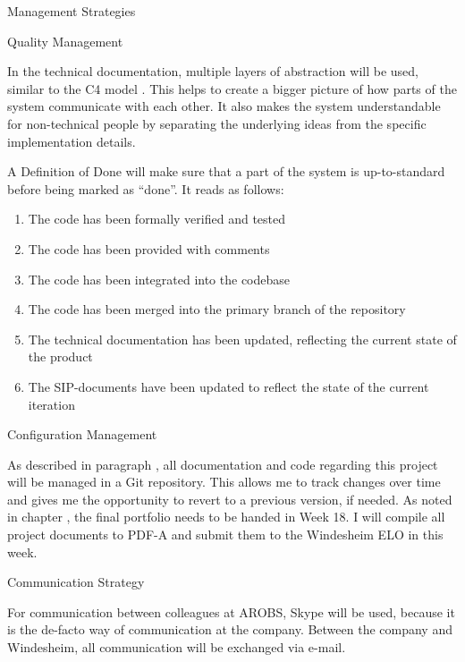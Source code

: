 \documentclass{matthijs}
\begin{document}
\begin{hoofdstuk}{Management Strategies}
\begin{paragraaf}{Quality Management}
			\bigskip

			In the technical documentation, multiple layers of abstraction will be used, similar to the C4 model \cite{brown2018the}.
			This helps to create a bigger picture of how parts of the system communicate with each other.
			It also makes the system understandable for non-technical people by separating the underlying ideas from the specific implementation details.

			\bigskip

			A Definition of Done will make sure that a part of the system is up-to-standard before being marked as \enquote{done}. It reads as follows:
			
			\begin{enumerate}
				\item The code has been formally verified and tested
				\item The code has been provided with comments
				\item The code has been integrated into the codebase
				\item The code has been merged into the primary branch of the repository
				\item The technical documentation has been updated, reflecting the current state of the product
				\item The SIP-documents have been updated to reflect the state of the current iteration
			\end{enumerate}

		\end{paragraaf}

		\begin{paragraaf}{Configuration Management}

			As described in paragraph , all documentation and code regarding this project will be managed in a Git repository.
			This allows me to track changes over time and gives me the opportunity to revert to a previous version, if needed.
			As noted in chapter , the final portfolio needs to be handed in Week 18.
			I will compile all project documents to PDF-A and submit them to the Windesheim ELO in this week.
			
		\end{paragraaf}

		\begin{paragraaf}{Communication Strategy}

			For communication between colleagues at AROBS, Skype will be used, because it is the de-facto way of communication at the company.
			Between the company and Windesheim, all communication will be exchanged via e-mail.
			

\end{paragraaf}
\end{hoofdstuk}
\end{document}
